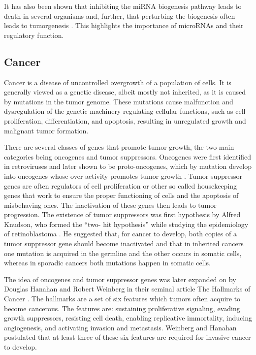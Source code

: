 It has also been shown that inhibiting the miRNA biogenesis pathway leads to
death in several organisms \citep{CITE} and, further, that perturbing the
biogenesis often leads to tumorgenesis \citep{CITE}. This highlights the
importance of microRNAs and their regulatory function.












\subsection{Cancer}\label{cancer}

Cancer is a disease of uncontrolled overgrowth of a population of cells. It is
generally viewed as a genetic disease, albeit mostly not inherited, as it is
caused by  mutations in the tumor genome. These mutations cause malfunction
and dysregulation of the genetic machinery regulating cellular functions, such
as cell proliferation, differentiation, and apoptosis, resulting in
unregulated growth and malignant tumor formation.

There are several classes of genes that promote tumor growth, the two main
categories being oncogenes and tumor suppressors. Oncogenes were first
identified in retroviruses and later shown to be proto-oncogenes, which by
mutation develop into oncogenes whose over activity promotes tumor growth
\citep{Varmus1988}. Tumor suppressor genes are often regulators of cell
proliferation or other so called housekeeping genes that work to ensure the
proper functioning of cells and the apoptosis of misbehaving ones. The
inactivation of these genes then leads to tumor progression. The existence of
tumor suppressors was first hypothesis by Alfred Knudson, who formed the “two-
hit hypothesis” while studying the epidemiology of retinoblastoma
\citep{Knudson1971}. He suggested that, for cancer to develop, both copies of
a tumor suppressor gene should become inactivated and that in inherited
cancers one mutation is acquired in the germline and the other occurs in
somatic cells, whereas in sporadic cancers both mutations happen in somatic
cells.

The idea of oncogenes and tumor suppressor genes was later expanded on by
Douglas Hanahan and Robert Weinberg in their seminal article The Hallmarks of
Cancer \citep{Hanahan2000}. The hallmarks are a set of six features which
tumors often acquire to become cancerous. The features are: sustaining
proliferative signaling, evading growth suppressors, resisting cell death,
enabling replicative immortality, inducing angiogenesis, and activating
invasion and metastasis. Weinberg and Hanahan postulated that at least three
of these six features are required for invasive cancer to develop.

